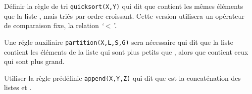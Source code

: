 \begin{Exercise}
\label{ex:prolog_quicksort}
Définir la règle de tri \verb|quicksort(X,Y)| qui dit que  contient
les mêmes éléments que la liste , mais triés par ordre croissant.
Cette version utilisera un opérateur de comparaison fixe, la relation
\textsl{`}$<$\textsl{'}.

Une régle auxiliaire \verb|partition(X,L,S,G)| sera nécessaire qui dit
que la liste  contient les éléments de la liste  qui sont plus
petits que , alors que  contient ceux qui sont plus grand.

Utiliser la règle prédéfinie \verb|append(X,Y,Z)| qui dit que  est la
concaténation des listes  et .
\end{Exercise}

\begin{Answer}[ref={ex:prolog_quicksort}]
\end{Answer}